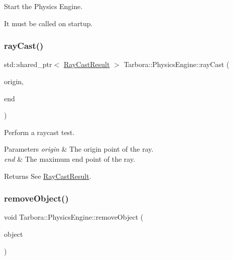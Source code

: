 Start the Physics Engine. 

It must be called on startup. \mbox{\label{classTarbora_1_1PhysicsEngine_aa8a52fabbe34b050ff53a28313425edd}} 
\subsubsection{\texorpdfstring{ray\+Cast()}{rayCast()}}
{\footnotesize\ttfamily std\+::shared\+\_\+ptr$<$ \hyperlink{structTarbora_1_1RayCastResult}{Ray\+Cast\+Result} $>$ Tarbora\+::\+Physics\+Engine\+::ray\+Cast (\begin{DoxyParamCaption}\item[{const glm\+::vec3 \&}]{origin,  }\item[{const glm\+::vec3 \&}]{end }\end{DoxyParamCaption})\hspace{0.3cm}{\ttfamily [static]}}



Perform a raycast test. 


\begin{DoxyParams}{Parameters}
{\em origin} & The origin point of the ray. \\
\hline
{\em end} & The maximum end point of the ray. \\
\hline
\end{DoxyParams}
\begin{DoxyReturn}{Returns}
See \hyperlink{structTarbora_1_1RayCastResult}{Ray\+Cast\+Result}. 
\end{DoxyReturn}
\mbox{\label{classTarbora_1_1PhysicsEngine_a107e09ad38a63f9ced3f4fcec7669e2a}} 
\subsubsection{\texorpdfstring{remove\+Object()}{removeObject()}}
{\footnotesize\ttfamily void Tarbora\+::\+Physics\+Engine\+::remove\+Object (\begin{DoxyParamCaption}\item[{bt\+Collision\+Object $\ast$}]{object }\end{DoxyParamCaption})\hspace{0.3cm}{\ttfamily [static]}}



